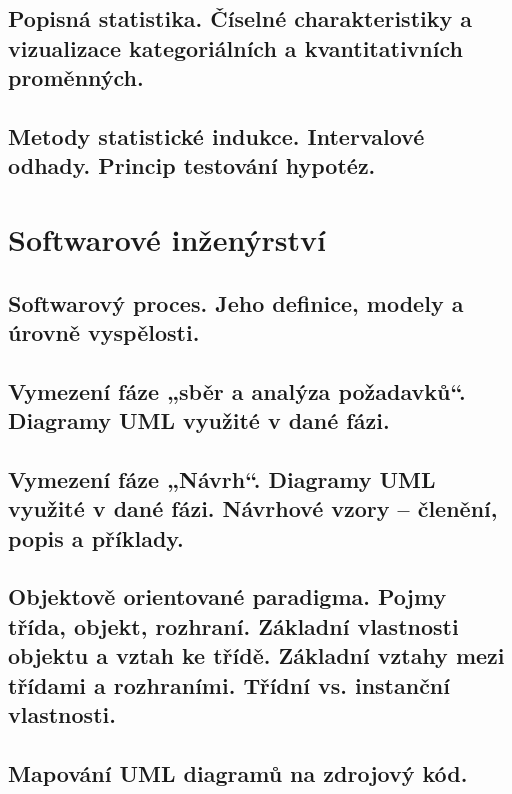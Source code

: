 \documentclass{book}
\begin{document}
\chapter{Popisná statistika. Číselné charakteristiky a vizualizace kategoriálních a kvantitativních proměnných.}

\clearpage

\chapter{Metody statistické indukce. Intervalové odhady. Princip testování hypotéz.}

\clearpage

\part{Softwarové inženýrství}

\chapter{Softwarový proces. Jeho definice, modely a úrovně vyspělosti.}

\clearpage

\chapter{Vymezení fáze „sběr a analýza požadavků“. Diagramy UML využité v dané fázi.}

\clearpage

\chapter{Vymezení fáze „Návrh“. Diagramy UML využité v dané fázi. Návrhové vzory – členění, popis a příklady. }

\clearpage

\chapter{Objektově orientované paradigma. Pojmy třída, objekt, rozhraní. Základní vlastnosti objektu a vztah ke třídě. Základní vztahy mezi třídami a rozhraními. Třídní vs. instanční vlastnosti.}

\clearpage

\chapter{Mapování UML diagramů na zdrojový kód.}

\clearpage
\end{document}
